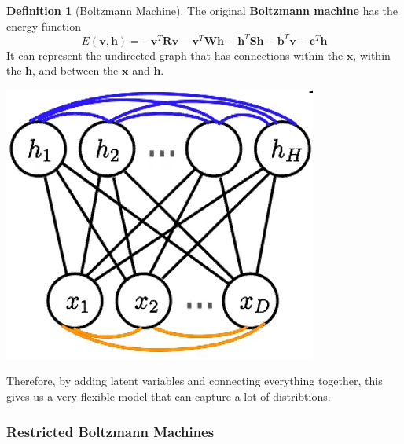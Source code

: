 \documentclass{article}
\theoremstyle{definition}
\theoremstyle{remark}
\theoremstyle{definition}
\newtheorem{definition}{Definition}[section]
\begin{document}
\begin{definition}[Boltzmann Machine]
    The original \textbf{Boltzmann machine} has the energy function 
\[E(\mathbf{v}, \mathbf{h}) = - \mathbf{v}^T \mathbf{R} \mathbf{v} - \mathbf{v}^T \mathbf{W} \mathbf{h} - \mathbf{h}^T \mathbf{S} \mathbf{h} - \mathbf{b}^T \mathbf{v} - \mathbf{c}^T \mathbf{h} \]
It can represent the undirected graph that has connections within the $\mathbf{x}$, within the $\mathbf{h}$, and between the $\mathbf{x}$ and $\mathbf{h}$.
\begin{center} 
    \includegraphics[scale=0.4]{Images/Boltzmann_lateral.png}
\end{center}
Therefore, by adding latent variables and connecting everything together, this gives us a very flexible model that can capture a lot of distribtions.
\end{definition} 

 \subsubsection{Restricted Boltzmann Machines} 
\end{document}
